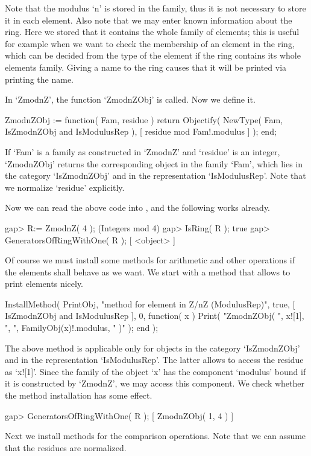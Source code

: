 Note that the modulus `n' is stored in the family,
thus it is not necessary to store it in each element.
Also note that we may enter known information about the ring.
Here we stored that it contains the whole family of elements;
this is useful for example when we want to check the membership of an
element in the ring, which can be decided from the type of the element
if the ring contains its whole elements family.
Giving a name to the ring causes that it will be printed
via printing the name.

In `ZmodnZ', the function `ZmodnZObj' is called.
Now we define it.

\beginexample
    ZmodnZObj := function( Fam, residue )
        return Objectify( NewType( Fam, IsZmodnZObj and IsModulusRep ),
                          [ residue mod Fam!.modulus ] );
    end;
\endexample

If `Fam' is a family as constructed in `ZmodnZ'
and `residue' is an integer,
`ZmodnZObj' returns the corresponding object in the family `Fam',
which lies in the category `IsZmodnZObj' and in the representation
`IsModulusRep'.
Note that we normalize `residue' explicitly.

Now we can read the above code into {\GAP},
and the following works already.

\beginexample
    gap> R:= ZmodnZ( 4 );
    (Integers mod 4)
    gap> IsRing( R );
    true
    gap> GeneratorsOfRingWithOne( R );
    [ <object> ]
\endexample

Of course we must install some methods for arithmetic and other
operations if the elements shall behave as we want.
We start with a method that allows to print elements nicely.

\beginexample
    InstallMethod( PrintObj,
        "method for element in Z/nZ (ModulusRep)",
        true,
        [ IsZmodnZObj and IsModulusRep ], 0,
        function( x )
        Print( "ZmodnZObj( ", x![1], ", ", FamilyObj(x)!.modulus, " )" );
        end );
\endexample

The above method is applicable only for objects in the category
`IsZmodnZObj' and in the representation `IsModulusRep'.
The latter allows to access the residue as `x![1]'.
Since the family of the object `x' has the component `modulus' bound
if it is constructed by `ZmodnZ', we may access this component.
We check whether the method installation has some effect.

\beginexample
    gap> GeneratorsOfRingWithOne( R );
    [ ZmodnZObj( 1, 4 ) ]
\endexample

Next we install methods for the comparison operations.
Note that we can assume that the residues are normalized.

